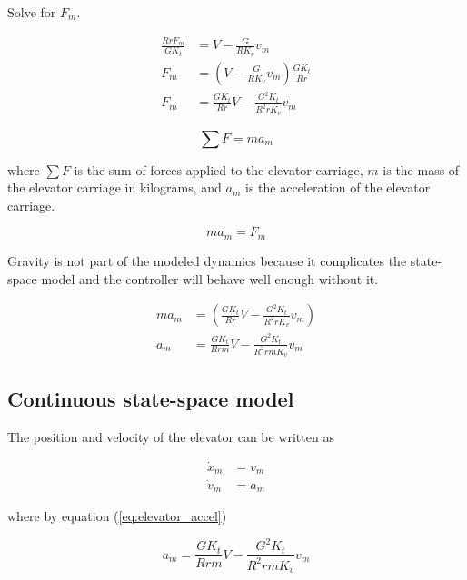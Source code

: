 Solve for $F_m$.

\begin{align}
  \frac{RrF_m}{GK_t} &= V - \frac{G}{RK_v} v_m \nonumber \\
  F_m &= \left(V - \frac{G}{RK_v} v_m\right) \frac{GK_t}{Rr} \nonumber \\
  F_m &= \frac{GK_t}{Rr} V - \frac{G^2K_t}{R^2 rK_v} v_m \label{eq:elevator_F_m}
\end{align}

\begin{equation}
  \sum F = ma_m \label{eq:elevator_F_ma}
\end{equation}

where $\sum F$ is the sum of forces applied to the elevator carriage, $m$ is the
mass of the elevator carriage in kilograms, and $a_m$ is the acceleration of the
elevator carriage.

\begin{equation*}
  ma_m = F_m
\end{equation*}

\begin{remark}
  Gravity is not part of the modeled dynamics because it complicates the
  state-space \gls{model} and the controller will behave well enough without it.
\end{remark}

\begin{align}
  ma_m &= \left(\frac{GK_t}{Rr} V - \frac{G^2K_t}{R^2 rK_v} v_m\right)
    \nonumber \\
  a_m &= \frac{GK_t}{Rrm} V - \frac{G^2K_t}{R^2 rmK_v} v_m
    \label{eq:elevator_accel}
\end{align}

\subsection{Continuous state-space model}

The position and velocity of the elevator can be written as

\begin{align}
  \dot{x}_m &= v_m \label{eq:elevator_cont_ss_pos} \\
  \dot{v}_m &= a_m \label{eq:elevator_cont_ss_vel}
\end{align}

where by equation (\ref{eq:elevator_accel})

\begin{equation*}
  a_m = \frac{GK_t}{Rrm} V - \frac{G^2 K_t}{R^2 rm K_v} v_m
\end{equation*}

